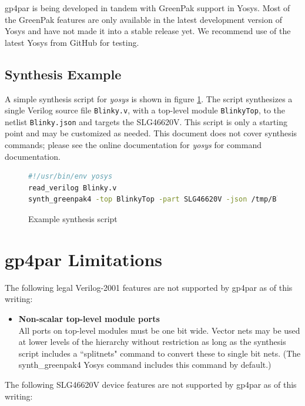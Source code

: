 \documentclass{article}
\begin{document}
gp4par is being developed in tandem with GreenPak support in Yosys. Most of the GreenPak features are only available in 
the latest development version of Yosys and have not made it into a stable release yet. We recommend use of the latest 
Yosys from GitHub for testing.

\subsection{Synthesis Example}

A simple synthesis script for \emph{yosys} is shown in figure \ref{yscript}. The script synthesizes a single Verilog 
source file \texttt{Blinky.v}, with a top-level module \texttt{BlinkyTop}, to the netlist \texttt{Blinky.json} and 
targets the SLG46620V. This script is only a starting point and may be customized as needed. This document does not
cover synthesis commands; please see the online documentation for \emph{yosys} for command documentation.
\begin{figure}[h]
\begin{lstlisting}[language=sh]
#!/usr/bin/env yosys
read_verilog Blinky.v
synth_greenpak4 -top BlinkyTop -part SLG46620V -json /tmp/Blinky.json
\end{lstlisting}
\caption{Example synthesis script}
\label{yscript}
\end{figure}

\pagebreak
\section{gp4par Limitations}

The following legal Verilog-2001 features are not supported by gp4par as of this writing:

\begin{itemize}
\item {\bfseries Non-scalar top-level module ports}\\All ports on top-level modules must be one bit wide. Vector nets 
may be used at lower levels of the hierarchy without restriction as long as the synthesis script includes a
``splitnets" command to convert these to single bit nets. (The synth\_greenpak4 Yosys command includes this command by 
default.)
\end{itemize}

The following SLG46620V device features are not supported by gp4par as of this writing:
\end{document}
